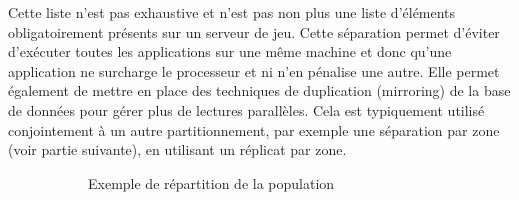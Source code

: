Cette liste n'est pas exhaustive et n'est pas non plus une liste d'éléments obligatoirement présents sur un serveur de jeu. Cette séparation permet d'éviter d'exécuter toutes les applications sur une même machine et donc qu'une application ne surcharge le processeur et ni n'en pénalise une autre. Elle permet également de mettre en place des techniques de duplication (mirroring) de la base de données pour gérer plus de lectures parallèles. Cela est typiquement utilisé conjointement à un autre partitionnement, par exemple une séparation par zone (voir partie suivante), en utilisant un réplicat par zone.

\begin{figure}[b!]
	\setlength{\fboxsep}{0pt}
		\centering
		\begin{subfigure}[t]{0.22\textwidth}
		\vspace{0pt}
			\caption{Exemple de répartition de la population}
			\label{fig:partitionnement_mono}
		\end{subfigure}
		~
		\begin{subfigure}[t]{0.22\textwidth}
		\vspace{0pt}

\end{subfigure}
\end{figure}

